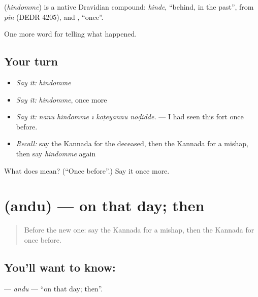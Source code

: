 \begin{cousinweb}
\textbf{} (\emph{hindomme}) is a native Dravidian compound: \emph{hinde}, \textquotedblleft{}behind, in the past\textquotedblright{}, from \emph{pin} (DEDR 4205), and , \textquotedblleft{}once\textquotedblright{}.
\end{cousinweb}

\begin{grammarlens}[title={What you've built}]
One more word for telling what happened.
\end{grammarlens}

\subsection*{Your turn}
\begin{itemize}
\raggedright
  \item \emph{Say it:} \emph{hindomme}
  \item \emph{Say it:} \emph{hindomme}, once more
  \item \emph{Say it:} \emph{nānu hindomme ī kōṭeyannu nōḍidde.} — I had seen this fort once before.
  \item \emph{Recall:} say the Kannada for the deceased, then the Kannada for a mishap, then say \emph{hindomme} again
\end{itemize}

\begin{tcolorbox}[breakable,colback=teal!4,colframe=teal!35!black,title={Before you move on}]
What does  mean? (\textquotedblleft{}Once before\textquotedblright{}.) Say it once more.
\end{tcolorbox}
\section[\texorpdfstring{\kn{ಅಂದು} (andu)}{ಅಂದು (andu)}]{ (andu) — on that day; then}

\label{lesson:KA-C331-andu}



\begin{quote}
Before the new one: say the Kannada for a mishap, then the Kannada for once before.
\end{quote}

\subsection*{You'll want to know: }
\textbf{} — \emph{andu} — \textquotedblleft{}on that day; then\textquotedblright{}.

